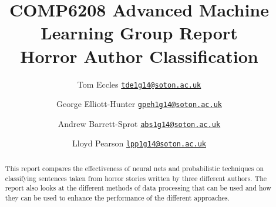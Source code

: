\documentclass[10pt,a4paper]{ieeeconf}
\begin{document}
  \title{
  COMP6208 Advanced Machine Learning Group Report\\
  \vspace{5mm}
    Horror Author Classification
  }
  \author{
    Tom Eccles \texttt{\href{mailto:tde1g14@soton.ac.uk}{tde1g14@soton.ac.uk}} \and
    George Elliott-Hunter \texttt{\href{mailto:gpeh1g14@soton.ac.uk}{gpeh1g14@soton.ac.uk}} \and
    Andrew Barrett-Sprot \texttt{\href{mailto:abs1g14@soton.ac.uk}{abs1g14@soton.ac.uk}} \and
    Lloyd Pearson \texttt{\href{mailto:lpp1g14@soton.ac.uk}{lpp1g14@soton.ac.uk}} \and
  }

  \maketitle
  \begin{abstract}
    This report compares the effectiveness of neural nets and probabilistic techniques on classifying sentences taken from horror stories written by three different authors. The report also looks at the different methods of data processing that can be used and how they can be used to enhance the performance of the different approaches.
  \end{abstract}
  
  
  
  
  
  
  
  
    
  \printbibliography
  
  \appendix
\end{document}
